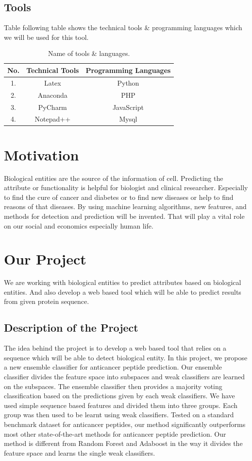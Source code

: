\subsection{Tools}
Table following table shows the technical tools \& programming languages which we will be used for this tool.
\begin{table}[htbp]
\caption[Tools]{Name of tools \& languages.}
\centering
\footnotesize
\begin{tabular}{|c|c|c|} \hline
\bf No. & \bf Technical Tools & \bf Programming Languages \\\hline
1. & Latex & Python  \\\hline
2. & Anaconda & PHP \\\hline
3. & PyCharm & JavaScript \\\hline
4. & Notepad++ & Mysql  \\\hline
\end{tabular}
\end{table}


\section{Motivation}
Biological entities are the source of the information of cell. Predicting the attribute or functionality is helpful for biologist and clinical researcher. Especially to find the cure of cancer and diabetes or to find new diseases or help to find reasons of that diseases. By using machine learning algorithms, new features, and methods for detection and prediction will be invented. That will play a vital role on our social and economics especially human life.

\section{Our Project}
We are working with biological entities to predict attributes based on biological entities. And also develop a web based tool which will be able to predict results from given protein sequence.

\subsection{Description of the Project}
The idea behind the project is to develop a web based tool that relies on a sequence which will be able to detect biological entity. In this project, we propose a new ensemble classifier for anticancer peptide prediction. Our ensemble classifier divides the feature space into subspaces and weak classifiers are learned on the subspaces. The ensemble classifier then provides a majority voting classification based on the predictions given by each weak classifiers. We have used simple sequence based features and divided them into three groups. Each group was then used to be learnt using weak classifiers. Tested on a standard benchmark dataset for anticancer peptides, our method significantly outperforms most other state-of-the-art methods for anticancer peptide prediction. Our method is different from Random Forest and Adaboost in the way it divides the feature space and learns the single weak classifiers.


